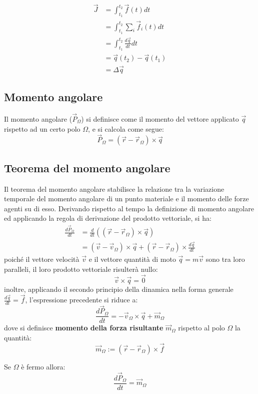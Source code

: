 \documentclass[11pt, a4paper, openright]{book}
\theoremstyle{plain}
\theoremstyle{definition}
\begin{document}
\begin{align}
    \vec{J} & = \int_{t_1}^{t_2} \vec{f}(t)dt \\
    & = \int_{t_1}^{t_2} \sum_i\vec{f}_i(t)dt \\
    & = \int_{t_1}^{t_2} \frac{d\vec{q}}{dt}dt \\
    & = \vec{q}(t_2) - \vec{q}(t_1) \\
    & = \Delta\vec{q}
\end{align}

\subsection{Momento angolare}
Il momento angolare ($\vec{P}_\Omega$) si definisce come il momento del vettore applicato $\vec{q}$ rispetto ad un certo polo $\Omega$, e si calcola come segue:
\[\vec{P}_\Omega = (\vec{r} - \vec{r}_\Omega) \times \vec{q}\]

\subsection{Teorema del momento angolare}
Il teorema del momento angolare stabilisce la relazione tra la variazione temporale del momento angolare di un punto materiale e il momento delle forze agenti su di esso. Derivando rispetto al tempo la definizione di momento angolare ed applicando la regola di derivazione del prodotto vettoriale, si ha:
\begin{align}
    \frac{d\vec{P}_\Omega}{dt} & = \frac{d}{dt}((\vec{r} - \vec{r}_\Omega) \times \vec{q}) \\
    & = (\vec{v} - \vec{v}_\Omega) \times \vec{q} + (\vec{r} - \vec{r}_\Omega) \times \frac{d\vec{q}}{dt}
\end{align}
poiché il vettore velocità $\vec{v}$ e il vettore quantità di moto $\vec{q} = m\vec{v}$ sono tra loro paralleli, il loro prodotto vettoriale risulterà nullo:
\[ \vec{v} \times \vec{q} = \vec{0} \]
inoltre, applicando il secondo principio della dinamica nella forma generale $\frac{d\vec{q}}{dt} = \vec{f}$, l'espressione precedente si riduce a:
\begin{equation}
    \frac{d\vec{P}_\Omega}{dt} = - \vec{v}_\Omega \times \vec{q} + \vec{m}_\Omega
\end{equation}
dove si definisce \textbf{momento della forza risultante} $\vec{m}_\Omega$ rispetto al polo $\Omega$ la quantità:
\[\vec{m}_\Omega := (\vec{r} - \vec{r}_\Omega) \times \vec{f}\]

Se $\Omega$ è fermo allora:
\[\frac{d\vec{P}_\Omega}{dt}  = \vec{m}_\Omega\]
\end{document}
